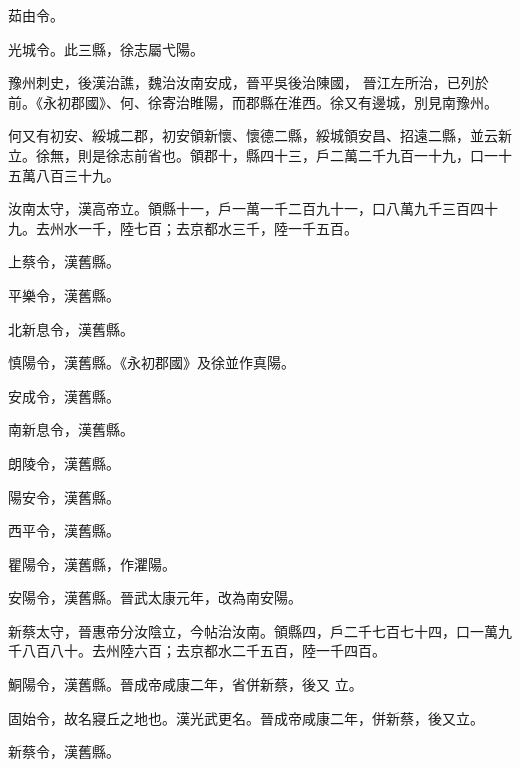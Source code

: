 \begin{pinyinscope}
 茹由令。



 光城令。此三縣，徐志屬弋陽。



 豫州刺史，後漢治譙，魏治汝南安成，晉平吳後治陳國，
 晉江左所治，已列於前。《永初郡國》、何、徐寄治睢陽，而郡縣在淮西。徐又有邊城，別見南豫州。



 何又有初安、綏城二郡，初安領新懷、懷德二縣，綏城領安昌、招遠二縣，並云新立。徐無，則是徐志前省也。領郡十，縣四十三，戶二萬二千九百一十九，口一十五萬八百三十九。



 汝南太守，漢高帝立。領縣十一，戶一萬一千二百九十一，口八萬九千三百四十九。去州水一千，陸七百；去京都水三千，陸一千五百。



 上蔡令，漢舊縣。



 平樂令，漢舊縣。



 北新息令，漢舊縣。



 慎陽令，漢舊縣。《永初郡國》及徐並作真陽。



 安成令，漢舊縣。



 南新息令，漢舊縣。



 朗陵令，漢舊縣。



 陽安令，漢舊縣。



 西平令，漢舊縣。



 瞿陽令，漢舊縣，作灈陽。



 安陽令，漢舊縣。晉武太康元年，改為南安陽。



 新蔡太守，晉惠帝分汝陰立，今帖治汝南。領縣四，戶二千七百七十四，口一萬九千八百八十。去州陸六百；去京都水二千五百，陸一千四百。



 鮦陽令，漢舊縣。晉成帝咸康二年，省併新蔡，後又
 立。



 固始令，故名寢丘之地也。漢光武更名。晉成帝咸康二年，併新蔡，後又立。



 新蔡令，漢舊縣。




\end{pinyinscope}
